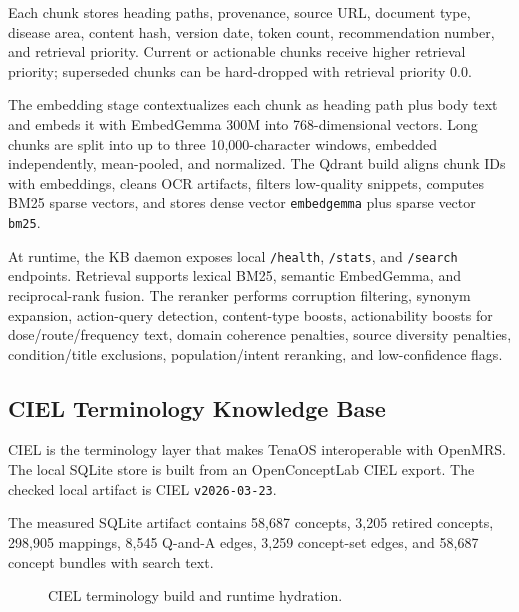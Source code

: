 \documentclass[11pt]{article}
\newcommand{\Product}{TenaOS}
\newcommand{\OpenMRS}{OpenMRS}
\newcommand{\CIEL}{CIEL}
\begin{document}
Each chunk stores heading paths, provenance, source URL, document type, disease area, content hash, version date, token count, recommendation number, and retrieval priority. Current or actionable chunks receive higher retrieval priority; superseded chunks can be hard-dropped with retrieval priority 0.0.

The embedding stage contextualizes each chunk as heading path plus body text and embeds it with EmbedGemma 300M into 768-dimensional vectors. Long chunks are split into up to three 10,000-character windows, embedded independently, mean-pooled, and normalized. The Qdrant build aligns chunk IDs with embeddings, cleans OCR artifacts, filters low-quality snippets, computes BM25 sparse vectors, and stores dense vector \texttt{embedgemma} plus sparse vector \texttt{bm25}.

At runtime, the KB daemon exposes local \texttt{/health}, \texttt{/stats}, and \texttt{/search} endpoints. Retrieval supports lexical BM25, semantic EmbedGemma, and reciprocal-rank fusion. The reranker performs corruption filtering, synonym expansion, action-query detection, content-type boosts, actionability boosts for dose/route/frequency text, domain coherence penalties, source diversity penalties, condition/title exclusions, population/intent reranking, and low-confidence flags.

\subsection{CIEL Terminology Knowledge Base}

\CIEL{} is the terminology layer that makes \Product{} interoperable with \OpenMRS{}. The local SQLite store is built from an OpenConceptLab CIEL export. The checked local artifact is CIEL \texttt{v2026-03-23}.

The measured SQLite artifact contains 58,687 concepts, 3,205 retired concepts, 298,905 mappings, 8,545 Q-and-A edges, 3,259 concept-set edges, and 58,687 concept bundles with search text.

\begin{figure}[h]
\centering
{}
\caption{CIEL terminology build and runtime hydration.}
\end{figure}
\end{document}
